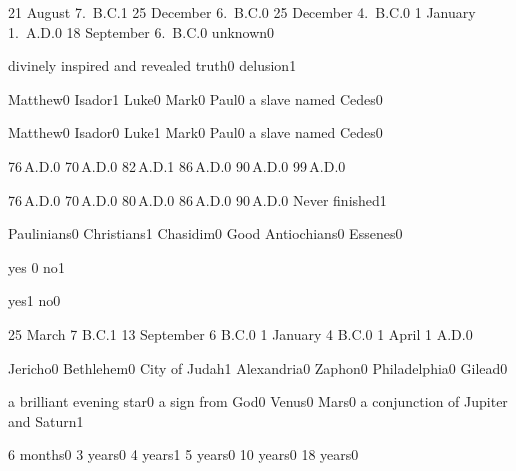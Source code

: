 {21 August 7.~B.C.}{1}
{25 December 6.~B.C.}{0}
{25 December 4.~B.C.}{0}
{1 January 1.~A.D.}{0}
{18 September 6.~B.C.}{0}
{unknown}{0}
\qstop


{divinely inspired and revealed truth}{0}
{delusion}{1}
\qstop

{Matthew}{0}
{Isador}{1}
{Luke}{0}
{Mark}{0}
{Paul}{0}
{a slave named Cedes}{0}
\qstop

{Matthew}{0}
{Isador}{0}
{Luke}{1}
{Mark}{0}
{Paul}{0}
{a slave named Cedes}{0}
\qstop

{76\,A.D.}{0}
{70\,A.D.}{0}
{82\,A.D.}{1}
{86\,A.D.}{0}
{90\,A.D.}{0}
{99\,A.D.}{0}
\qstop

{76\,A.D.}{0}
{70\,A.D.}{0}
{80\,A.D.}{0}
{86\,A.D.}{0}
{90\,A.D.}{0}
{Never finished}{1}
\qstop

{Paulinians}{0}
{Christians}{1}
{Chasidim}{0}
{Good Antiochians}{0}
{Essenes}{0}
\qstop


{yes }{0}
{no}{1}
\qstop

{yes}{1}
{no}{0}
\qstop

{25 March 7 B.C.}{1}
{13 September 6 B.C.}{0}
{1 January 4 B.C.}{0}
{1 April 1 A.D.}{0}
\qstop

{Jericho}{0}
{Bethlehem}{0}
{City of Judah}{1}
{Alexandria}{0}
{Zaphon}{0}
{Philadelphia}{0}
{Gilead}{0}
\qstop

{a brilliant evening star}{0}
{a sign from God}{0}
{Venus}{0}
{Mars}{0}
{a conjunction of Jupiter and Saturn}{1}
\qstop


{6 months}{0}
{3 years}{0}
{4 years}{1}
{5 years}{0}
{10 years}{0}
{18 years}{0}
\qstop

